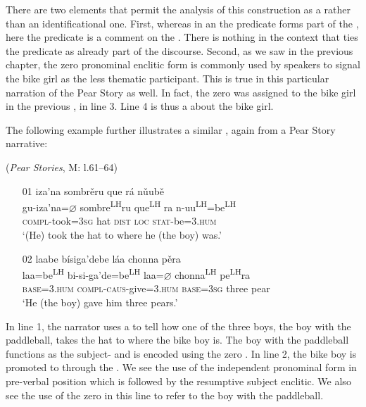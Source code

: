 There are two elements that permit the analysis of this construction as a  rather than an identificational one. First, whereas in an  the predicate forms part of the , here the predicate is a comment on the . There is nothing in the context that ties the predicate as already part of the discourse. Second, as we saw in the previous chapter, the zero  pronominal enclitic form is commonly used by speakers to signal the bike girl as the less thematic participant. This is true in this particular narration of the Pear Story as well. In fact, the zero  was assigned to the bike girl in the previous , in line 3. Line 4 is thus a  about the bike girl.



The following example further illustrates a similar , again from a Pear Story narrative:

\ea\label{topicalization2} (\textit{Pear Stories}, M: l.61--64)

\begin{itemize}


\item[01] 
\glll iza'na sombr\v{e}ru que r\'{a} n\v{u}ub\v{e}  \\
gu-iza'na=$\varnothing$ sombre\textsuperscript{LH}ru que\textsuperscript{LH} ra n-uu\textsuperscript{LH}=be\textsuperscript{LH}  \\
\textsc{compl}-took=\textsc{3sg} hat \textsc{dist} \textsc{loc} \textsc{stat}-be=\textsc{3.hum}  \\
\glt `(He) took the hat to where he (the boy) was.'


\item[02]
\glll laabe b\'{i}siga'debe l\'{a}a chonna p\v{e}ra  \\
laa=be\textsuperscript{LH} bi-si-ga'de=be\textsuperscript{LH} laa=$\varnothing$ chonna\textsuperscript{LH} pe\textsuperscript{LH}ra  \\
\textsc{base}=\textsc{3.hum} \textsc{compl}-\textsc{caus}-give=\textsc{3.hum} \textsc{base}=\textsc{3sg} three pear  \\
\glt `He (the boy) gave him three pears.' 

\end{itemize}
\z
In line 1, the narrator uses a  to tell how one of the three boys, the boy with the paddleball, takes the hat to where the bike boy is. The boy with the paddleball functions as the subject- and is encoded using the zero . In line 2, the bike boy is promoted to  through the . We see the use of the independent pronominal form in pre-verbal position which is followed by the resumptive subject enclitic. We also see the use of the zero  in this line to refer to the boy with the paddleball. 



